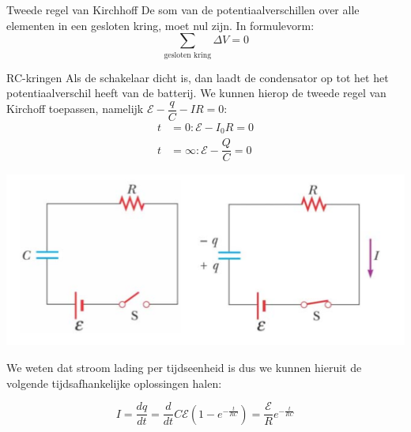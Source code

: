 \begin{theo}{Tweede regel van Kirchhoff}
    De som van de potentiaalverschillen over alle elementen in een gesloten kring, moet nul zijn. In formulevorm:
    \begin{equation*}
        \sum_{\text{gesloten kring}} \Delta V = 0
    \end{equation*}
    \vspace{-0.4cm}
\end{theo}

\newpage

\begin{app}[RC-kringen]{RC-kringen}
    Als de schakelaar dicht is, dan laadt de condensator op tot het het potentiaalverschil heeft van de batterij.
    We kunnen hierop de tweede regel van Kirchoff toepassen, namelijk $\mathcal{E} - \dfrac{q}{C} - IR = 0$:
    \begin{align*}
        t &= 0: \mathcal{E} - I_0R = 0 \\ 
        t &= \infty: \mathcal{E} - \dfrac{Q}{C} = 0
    \end{align*}
    \begin{center}
        \includegraphics[scale = 0.3]{Images/Elektriciteit/RC-kring.png}
    \end{center}
    We weten dat stroom lading per tijdseenheid is dus we kunnen hieruit de volgende tijdsafhankelijke oplossingen halen:

    \begin{equation*}
         I = \dfrac{dq}{dt} = \dfrac{d}{dt} C\mathcal{E}(1-e^{-\tfrac{t}{RC}}) = \dfrac{\mathcal{E}}{R}e^{-\tfrac{t}{RC}}
    \end{equation*}
    

\end{app}
